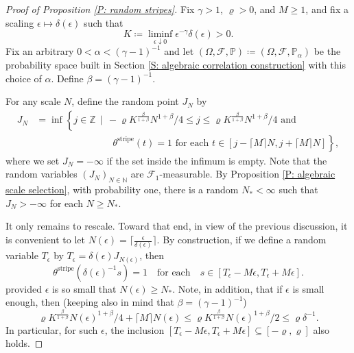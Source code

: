 \documentclass[12pt]{amsart}
\begin{document}
	\begin{proof}[Proof of Proposition \ref{P: random stripes}] Fix $\gamma > 1$, $\varrho > 0$, and $M \geq 1$, and fix a scaling $\epsilon \mapsto \delta(\epsilon)$ such that 
		\begin{equation} \label{E: algebraic scaling}
			K\coloneqq \liminf_{\epsilon \downarrow 0} \epsilon^{-\gamma} \delta(\epsilon) > 0.
		\end{equation}
	Fix an arbitrary $0 < \alpha < (\gamma - 1)^{-1}$ and let $(\Omega,\mathcal{F},\mathbb{P}) \coloneqq (\Omega,\mathcal{F},\mathbb{P}_{\alpha})$ be the probability space built in Section \ref{S: algebraic correlation construction} with this choice of $\alpha$.  Define $\beta = (\gamma - 1)^{-1}$.
	
	For any scale $N$, define the random point $J_{N}$ by
		\begin{align*}
			J_{N} &= \inf \left\{ j \in \mathbb{Z} \, \mid \, - \varrho K^{\frac{\beta}{1 + \beta}} N^{1 + \beta}/4 \leq j \leq \varrho K^{\frac{\beta}{1 + \beta}} N^{1 + \beta}/4 \, \, \text{and} \, \,  \right. \\
				&\qquad \qquad \qquad \qquad \left. \theta^{\text{stripe}}(t) = 1 \, \, \text{for each} \, \, t \in [j - \lceil M \rceil N, j + \lceil M \rceil N] \right\},
		\end{align*}
	where we set $J_{N} = -\infty$ if the set inside the infimum is empty.  Note that the random variables $(J_{N})_{N \in \mathbb{N}}$ are $\mathcal{F}_{1}$-measurable.  By Proposition \ref{P: algebraic scale selection}, with probability one, there is a random $N_{*} < \infty$ such that $J_{N} > -\infty$ for each $N \geq N_{*}$.
	
	It only remains to rescale.  Toward that end, in view of the previous discussion, it is convenient to let $N(\epsilon) = \lceil \frac{\epsilon}{\delta(\epsilon)} \rceil$.  By construction, if we define a random variable $T_{\epsilon}$ by $T_{\epsilon} = \delta(\epsilon) J_{N(\epsilon)}$, then
		\begin{equation*}
			\theta^{\text{stripe}}(\delta(\epsilon)^{-1} s) = 1 \quad \text{for each} \quad s \in [T_{\epsilon} - M \epsilon, T_{\epsilon} + M \epsilon].
		\end{equation*}
	provided $\epsilon$ is so small that $N(\epsilon) \geq N_{*}$.  Note, in addition, that if $\epsilon$ is small enough, then (keeping also in mind that $ \beta = ( \gamma - 1 )^{-1} $)
		\begin{equation*}
			\varrho K^{\frac{\beta}{1 + \beta}} N(\epsilon)^{1 + \beta}/4 + \lceil M \rceil N(\epsilon) \leq \varrho K^{\frac{\beta}{1 + \beta}} N(\epsilon)^{1 + \beta} / 2 \leq \varrho \delta^{-1}.
		\end{equation*}
	In particular, for such $\epsilon$, the inclusion $[T_{\epsilon} - M \epsilon, T_{\epsilon} + M\epsilon] \subseteq [-\varrho,\varrho]$ also holds.
		\end{proof}
\end{document}
